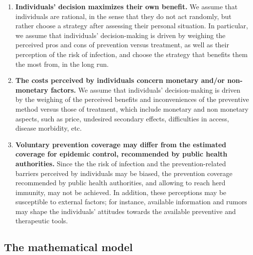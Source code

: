 \begin{enumerate}[label= \bf \roman*)]
\item \textbf{Individuals' decision maximizes their own benefit.} 
We assume that individuals are rational, in the sense that they do not act randomly, but rather  choose a strategy  after assessing their personal situation. In particular, we assume that individuals' decision-making is driven by weighing the perceived pros and cons of prevention versus treatment, as well as their perception of the risk of infection, and choose the strategy that benefits them the most from, in the long run.
\item \textbf{The costs perceived by individuals concern monetary and/or non-monetary factors.} 
We assume that individuals' decision-making is driven by the weighing of the perceived benefits and inconveniences of the preventive method versus those of treatment, which include monetary and non monetary aspects, such as price, undesired secondary effects, difficulties in access, disease morbidity, etc.


\item \textbf{Voluntary prevention coverage may differ from the estimated coverage for epidemic control, recommended by public health authorities.} 
Since the the risk of infection and the prevention-related barriers perceived by individuals may be biased, the prevention coverage recommended by public health authorities, and allowing to reach herd immunity, may not be achieved. In addition, these perceptions may be susceptible to external factors; for instance, available information and rumors may shape the individuals' attitudes towards the available preventive and therapeutic tools.
\end{enumerate}


\subsection{The mathematical model}
\label{Intro:Model} 

